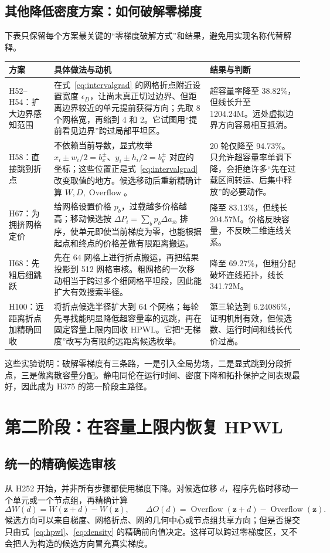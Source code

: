 \documentclass[UTF8,a4paper,11pt]{ctexrep}
\newcommand{\Overflow}{\operatorname{Overflow}}
\begin{document}
\section{其他降低密度方案：如何破解零梯度}
下表只保留每个方案最关键的“零梯度破解方式”和结果，避免用实现名称代替解释。
\begin{longtable}{p{2.2cm}p{6.2cm}p{3.3cm}}
\toprule 方案 & 具体做法与动机 & 结果与判断\\\midrule\endhead
H52--H54：扩大边界感知范围 & 在式~\eqref{eq:intervalgrad} 的网格折点附近设置宽度 $\epsilon_D$，让尚未真正切过边界、但距离边界较近的单元提前获得方向；先取 8 个网格宽，再缩到 4 和 2。它试图用“提前看见边界”跨过局部平坦区。 & 超容量率降至 38.82\%，但线长升至 1204.24M。远处虚拟边界方向容易相互抵消。\\
H58：直接跳到折点 & 不依赖当前导数，显式枚举 $x_i\pm w_i/2=b_x^\pm$、$y_i\pm h_i/2=b_y^\pm$ 对应的坐标；这些位置正是式~\eqref{eq:intervalgrad} 改变取值的地方。候选移动后重新精确计算 $W,D,\Overflow$。 & 20 轮仅降至 94.73\%。只允许超容量率单调下降，会拒绝许多“先在过载区间转运、后集中释放”的必要动作。\\
H67：为拥挤网格定价 & 给网格设置价格 $p_b$，过载越多价格越高；移动候选按 $\Delta P_i=\sum_b p_b\Delta a_{ib}$ 排序，使单元即使当前梯度为零，也能根据起点和终点的价格差做有限距离搬运。 & 降至 83.13\%，但线长 204.57M。价格反映容量，不反映二维连线关系。\\
H68：先粗后细跳跃 & 先在 64 网格上进行折点搬运，再把结果投影到 512 网格审核。粗网格的一次移动相当于跨过多个细网格平坦段，因此能扩大有效搜索半径。 & 降至 69.27\%，但粗分配破坏连线拓扑，线长 341.72M。\\
H100：远距离折点加精确回收 & 将折点候选半径扩大到 64 个网格；每轮先寻找能明显降低超容量率的远跳，再在固定容量上限内回收 HPWL。它把“无梯度”改写为有限的远距离候选枚举。 & 第三轮达到 6.24086\%，证明机制有效，但候选数、运行时间和线长代价过高。\\
\bottomrule
\end{longtable}
这些实验说明：破解零梯度有三条路，一是引入全局势场，二是显式跳到分段折点，三是做离散容量分配。静电同伦在运行时间、密度下降和拓扑保护之间表现最好，因此成为 H375 的第一阶段主路径。

\chapter{第二阶段：在容量上限内恢复 HPWL}
\section{统一的精确候选审核}
从 H252 开始，并非所有步骤都使用梯度下降。对候选位移 $d$，程序先临时移动一个单元或一个节点组，再精确计算
\begin{equation}
 \Delta W(d)=W(\bm z+d)-W(\bm z),\qquad
 \Delta O(d)=\Overflow(\bm z+d)-\Overflow(\bm z). \label{eq:exactdelta}
\end{equation}
候选方向可以来自梯度、网格折点、网的几何中心或节点组共享方向；但是否提交只由式~\eqref{eq:hpwl}、\eqref{eq:density} 的精确前向值决定。这样可以跨过零梯度区，又不会把人为构造的候选方向冒充真实梯度。
\end{document}

